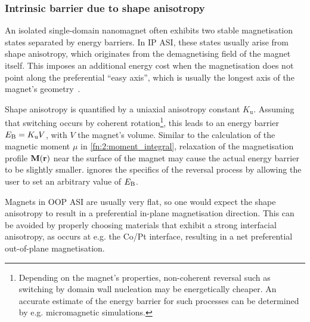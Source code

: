 \subsubsection{Intrinsic barrier due to shape anisotropy} %
An isolated single-domain nanomagnet often exhibits two stable magnetisation states separated by energy barriers.
In IP ASI, these states usually arise from shape anisotropy, which originates from the demagnetising field of the magnet itself.
This imposes an additional energy cost when the magnetisation does not point along the preferential ``easy axis'', which is usually the longest axis of the magnet's geometry~\cite{PhD_Leliaert}. \par
Shape anisotropy is quantified by a uniaxial anisotropy constant $K_\mathrm{u}$.
Assuming that switching occurs by coherent rotation\footnote{
	Depending on the magnet's properties, non-coherent reversal such as switching by domain wall nucleation may be energetically cheaper.
	An accurate estimate of the energy barrier for such processes can be determined by e.g. micromagnetic simulations.
}, this leads to an energy barrier $E_\mathrm{B} = K_\mathrm{u} V$, with $V$ the magnet's volume.
Similar to the calculation of the magnetic moment $\mu$ in \cref{fn:2:moment_integral}, relaxation of the magnetisation profile $\boldsymbol{\mathbf{M}}(\boldsymbol{\mathbf{r}})$ near the surface of the magnet may cause the actual energy barrier to be slightly smaller.
\hotspice ignores the specifics of the reversal process by allowing the user to set an arbitrary value of $E_\mathrm{B}$. \par
Magnets in OOP ASI are usually very flat, so one would expect the shape anisotropy to result in a preferential in-plane magnetisation direction.
This can be avoided by properly choosing materials that exhibit a strong interfacial anisotropy, as occurs at e.g. the Co/Pt interface, resulting in a net preferential out-of-plane magnetisation.

